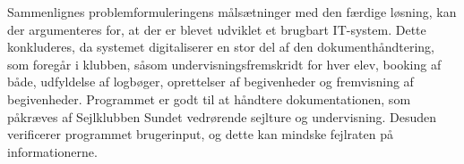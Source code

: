 Sammenlignes problemformuleringens målsætninger med den færdige løsning, kan der argumenteres for, at der er blevet udviklet et brugbart IT-system. 
Dette konkluderes, da systemet digitaliserer en stor del af den dokumenthåndtering, som foregår i klubben, såsom undervisningsfremskridt for hver elev, booking af både, udfyldelse af logbøger, oprettelser af begivenheder og fremvisning af begivenheder.
Programmet er godt til at håndtere dokumentationen, som påkræves af Sejlklubben Sundet vedrørende sejlture og undervisning.
Desuden verificerer programmet brugerinput, og dette kan mindske fejlraten på informationerne.